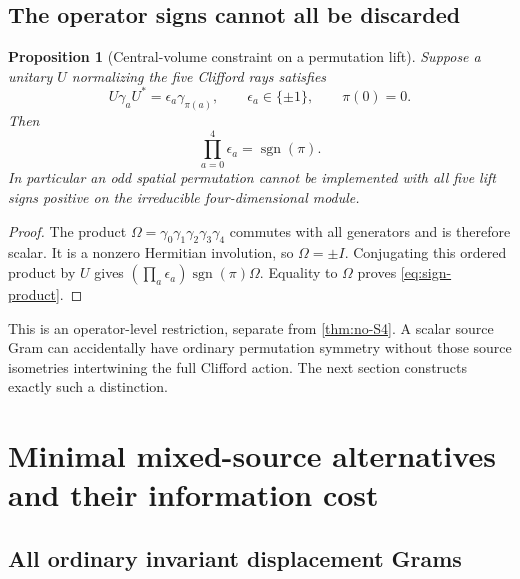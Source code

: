 \documentclass[11pt]{article}
\newtheorem{proposition}[proposition]{Proposition}
\theoremstyle{definition}
\theoremstyle{remark}
\begin{document}
\subsection{The operator signs cannot all be discarded}
\begin{proposition}[Central-volume constraint on a permutation lift]
\label{prop:volume}
Suppose a unitary $U$ normalizing the five Clifford rays satisfies
\[
 U\gamma_aU^*=\epsilon_a\gamma_{\pi(a)},\qquad
 \epsilon_a\in\{\pm1\},\qquad \pi(0)=0.
\]
Then
\begin{equation}
 \boxed{\prod_{a=0}^4\epsilon_a=\operatorname{sgn}(\pi).}
 \label{eq:sign-product}
\end{equation}
In particular an odd spatial permutation cannot be implemented with all five
lift signs positive on the irreducible four-dimensional module.
\end{proposition}
\begin{proof}
The product $\Omega=\gamma_0\gamma_1\gamma_2\gamma_3\gamma_4$ commutes with
all generators and is therefore scalar. It is a nonzero Hermitian
involution, so $\Omega=\pm I$. Conjugating this ordered product by $U$ gives
$(\prod_a\epsilon_a)\operatorname{sgn}(\pi)\Omega$. Equality to $\Omega$
proves \eqref{eq:sign-product}.
\end{proof}

This is an operator-level restriction, separate from
\cref{thm:no-S4}. A scalar source Gram can accidentally have ordinary
permutation symmetry without those source isometries intertwining the full
Clifford action. The next section constructs exactly such a distinction.

\section{Minimal mixed-source alternatives and their information cost}
\label{sec:mixed}

\subsection{All ordinary invariant displacement Grams}
\end{document}
